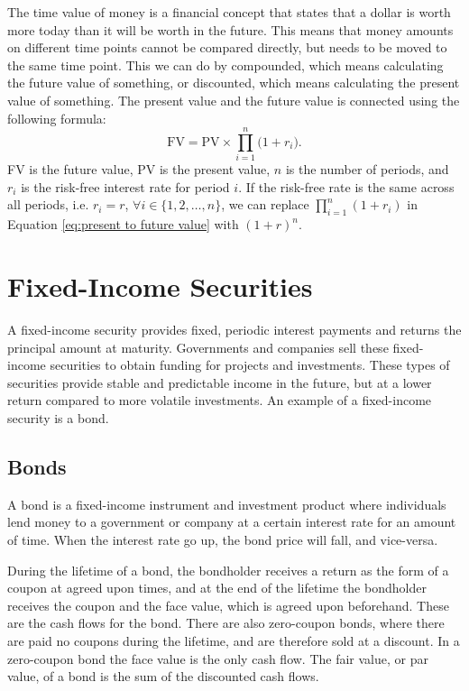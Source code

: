 \noindent The time value of money is a financial concept that states that a dollar is worth more today than it will be worth in the future. This means that money amounts on different time points cannot be compared directly, but needs to be moved to the same time point. This we can do by compounded, which means calculating the future value of something, or discounted, which means calculating the present value of something. The present value and the future value is connected using the following formula: \begin{equation} \label{eq:present to future value}
    \text{FV} = \text{PV} \times \prod_{i = 1}^n \bigl( 1 + r_i \bigr).
\end{equation} FV is the future value, PV is the present value, $n$ is the number of periods, and $r_i$ is the risk-free interest rate for period $i$. If the risk-free rate is the same across all periods, i.e. $r_i = r$, $\forall i \in \{ 1, 2, \ldots, n \}$, we can replace $\prod_{i = 1}^n ( 1 + r_i )$ in Equation \eqref{eq:present to future value} with $( 1 + r )^n$. \cite{investopedia_time_value_of_money}

\section{Fixed-Income Securities}

\noindent A fixed-income security provides fixed, periodic interest payments and returns the principal amount at maturity. Governments and companies sell these fixed-income securities to obtain funding for projects and investments. These types of securities provide stable and predictable income in the future, but at a lower return compared to more volatile investments. An example of a fixed-income security is a bond. \cite{investopedia_fixed_income}

\subsection{Bonds}

\noindent A bond is a fixed-income instrument and investment product where individuals lend money to a government or company at a certain interest rate for an amount of time. When the interest rate go up, the bond price will fall, and vice-versa. \cite{investopedia_bonds}

During the lifetime of a bond, the bondholder receives a return as the form of a coupon at agreed upon times, and at the end of the lifetime the bondholder receives the coupon and the face value, which is agreed upon beforehand. These are the cash flows for the bond. There are also zero-coupon bonds, where there are paid no coupons during the lifetime, and are therefore sold at a discount. In a zero-coupon bond the face value is the only cash flow. The fair value, or par value, of a bond is the sum of the discounted cash flows. \cite{investopedia_bond_valuation}

